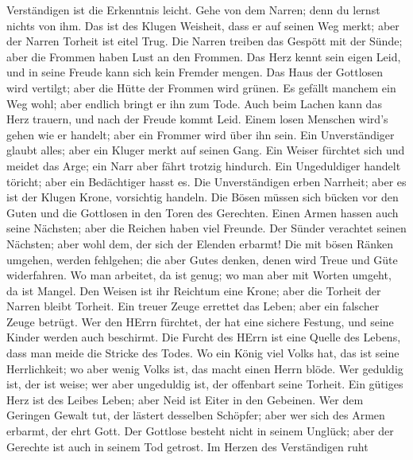 Verständigen ist die Erkenntnis leicht.  Gehe von dem
Narren; denn du lernst nichts von ihm.  Das ist des Klugen
Weisheit, dass er auf seinen Weg merkt; aber der Narren Torheit ist
eitel Trug.  Die Narren treiben das Gespött mit der Sünde;
aber die Frommen haben Lust an den Frommen.  Das Herz kennt
sein eigen Leid, und in seine Freude kann sich kein Fremder mengen.
 Das Haus der Gottlosen wird vertilgt; aber die Hütte der
Frommen wird grünen.  Es gefällt manchem ein Weg wohl; aber
endlich bringt er ihn zum Tode.  Auch beim Lachen kann das
Herz trauern, und nach der Freude kommt Leid.  Einem losen
Menschen wird's gehen wie er handelt; aber ein Frommer wird über ihn
sein.  Ein Unverständiger glaubt alles; aber ein Kluger
merkt auf seinen Gang.  Ein Weiser fürchtet sich und meidet
das Arge; ein Narr aber fährt trotzig hindurch.  Ein
Ungeduldiger handelt töricht; aber ein Bedächtiger hasst es.
 Die Unverständigen erben Narrheit; aber es ist der Klugen
Krone, vorsichtig handeln.  Die Bösen müssen sich bücken
vor den Guten und die Gottlosen in den Toren des Gerechten.
 Einen Armen hassen auch seine Nächsten; aber die Reichen
haben viel Freunde.  Der Sünder verachtet seinen Nächsten;
aber wohl dem, der sich der Elenden erbarmt!  Die mit bösen
Ränken umgehen, werden fehlgehen; die aber Gutes denken, denen wird
Treue und Güte widerfahren.  Wo man arbeitet, da ist genug;
wo man aber mit Worten umgeht, da ist Mangel.  Den Weisen
ist ihr Reichtum eine Krone; aber die Torheit der Narren bleibt Torheit.
 Ein treuer Zeuge errettet das Leben; aber ein falscher
Zeuge betrügt.  Wer den HErrn fürchtet, der hat eine
sichere Festung, und seine Kinder werden auch beschirmt. 
Die Furcht des HErrn ist eine Quelle des Lebens, dass man meide die
Stricke des Todes.  Wo ein König viel Volks hat, das ist
seine Herrlichkeit; wo aber wenig Volks ist, das macht einen Herrn
blöde.  Wer geduldig ist, der ist weise; wer aber
ungeduldig ist, der offenbart seine Torheit.  Ein gütiges
Herz ist des Leibes Leben; aber Neid ist Eiter in den Gebeinen.
 Wer dem Geringen Gewalt tut, der lästert desselben
Schöpfer; aber wer sich des Armen erbarmt, der ehrt Gott. 
Der Gottlose besteht nicht in seinem Unglück; aber der Gerechte ist auch
in seinem Tod getrost.  Im Herzen des Verständigen ruht
